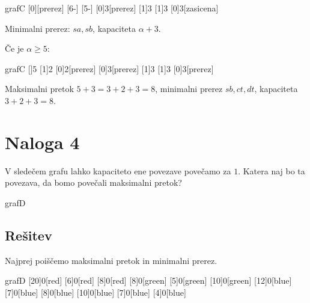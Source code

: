 \documentclass[14pt]{extarticle}
\begin{document}
\begin{pretok}{grafC}
    \nicle
    [0]{\alpha}[prerez]
    [6-\alpha]{}
    [5-\alpha]{}
    [0]{3}[prerez]
    [1]{3}
    [1]{3}
    [0]{3}[zasicena]

\end{pretok}

Minimalni prerez: $sa, sb$, kapaciteta $\alpha + 3$.

\clearpage
Če je $\alpha \ge 5$:

\begin{pretok}{grafC}
    \nicle
    []{5}
    [1]{2}
    [0]{2}[prerez]
    [0]{3}[prerez]
    [1]{3}
    [1]{3}
    [0]{3}[prerez]


\end{pretok}

Maksimalni pretok $5+3 = 3+2+3 = 8$, minimalni prerez $sb, ct, dt$, kapaciteta $3+2+3 = 8$.

\clearpage

\section*{Naloga 4}

V sledečem grafu lahko kapaciteto ene povezave povečamo za $1$. Katera naj bo ta povezava, da bomo povečali maksimalni pretok?

\begin{pretok}{grafD}
\end{pretok}

\clearpage

\subsection*{Rešitev}

Najprej poiščemo maksimalni pretok in minimalni prerez.

\begin{pretok}{grafD}
    \nicle
    [20]{0}[red]
    [6]{0}[red]
    [8]{0}[red]
    [8]{0}[green]
    [5]{0}[green]
    [10]{0}[green]
    [12]{0}[blue]
    [7]{0}[blue]
    [8]{0}[blue]
    [10]{0}[blue]
    [7]{0}[blue]
    [4]{0}[blue]
\end{pretok}
\end{document}
